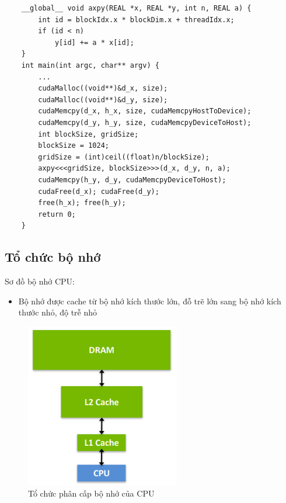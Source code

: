 \documentclass[14pt, a4paper]{article}
\numberwithin{equation}{section}
\numberwithin{figure}{section}
\numberwithin{dl}{section}
\numberwithin{md}{section}
\numberwithin{bd}{section}
\numberwithin{dn}{section}
\numberwithin{hq}{section}
\begin{document}
\begin{verbatim}
    __global__ void axpy(REAL *x, REAL *y, int n, REAL a) {
        int id = blockIdx.x * blockDim.x + threadIdx.x;
        if (id < n)
            y[id] += a * x[id];
    }
    int main(int argc, char** argv) {
        ...
        cudaMalloc((void**)&d_x, size);
        cudaMalloc((void**)&d_y, size);
        cudaMemcpy(d_x, h_x, size, cudaMemcpyHostToDevice);
        cudaMemcpy(d_y, h_y, size, cudaMemcpyDeviceToHost);
        int blockSize, gridSize;
        blockSize = 1024;
        gridSize = (int)ceil((float)n/blockSize);
        axpy<<<gridSize, blockSize>>>(d_x, d_y, n, a);
        cudaMemcpy(h_y, d_y, cudaMemcpyDeviceToHost);
        cudaFree(d_x); cudaFree(d_y);
        free(h_x); free(h_y);
        return 0;
    }
    \end{verbatim}

\subsection{Tổ chức bộ nhớ}

Sơ đồ bộ nhớ CPU:

\begin{itemize}
    \item Bộ nhớ được cache từ bộ nhớ kích thước lớn, đỗ trẽ lớn sang bộ nhớ kích thước nhỏ, độ trễ nhỏ
\end{itemize}

\begin{figure}[H]
    \centering
    \includegraphics[width=0.6\textwidth]{figures/CUDA/CPU_Memory_Hierachy.png}
    \caption{Tổ chức phân cấp bộ nhớ của CPU}
\end{figure}
\end{document}

